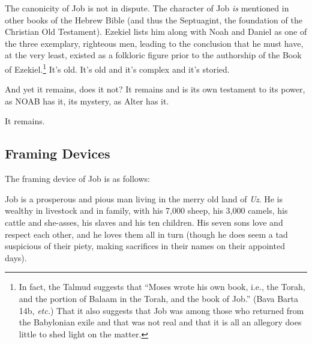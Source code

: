 The canonicity of Job is not in dispute. The character of Job \emph{is} mentioned in other books of the Hebrew Bible (and thus the Septuagint, the foundation of the Christian Old Testament). Ezekiel lists him along with Noah and Daniel as one of the three exemplary, righteous men, leading to the conclusion that he must have, at the very least, existed as a folkloric figure prior to the authorship of the Book of Ezekiel.\footnote{In fact, the Talmud suggests that ``Moses wrote his own book, i.e., the Torah, and the portion of Balaam in the Torah, and the book of Job.'' (Bava Barta 14b, \emph{etc.}) That it also suggests that Job was among those who returned from the Babylonian exile and that was not real and that it is all an allegory does little to shed light on the matter.} It's old. It's old and it's complex and it's storied.

And yet it remains, does it not? It remains and is its own testament to its power, as NOAB has it, its mystery, as Alter has it.

It remains.

\hypertarget{framing-devices}{%
\subsection*{Framing Devices}\label{framing-devices}}

The framing device of Job is as follows:

Job is a prosperous and pious man living in the merry old land of \emph{Uz}. He is wealthy in livestock and in family, with his 7,000 sheep, his 3,000 camels, his cattle and she-asses, his slaves and his ten children. His seven sons love and respect each other, and he loves them all in turn (though he does seem a tad suspicious of their piety, making sacrifices in their names on their appointed days).

